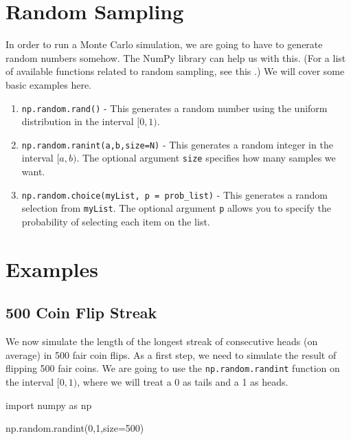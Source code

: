\documentclass{ximera}
\begin{document}
\section{Random Sampling}

In order to run a Monte Carlo simulation, we are going to have to generate random numbers somehow. The NumPy library can help us with this. (For a list of available functions related to random sampling, see this .) We will cover some basic examples here.
\begin{enumerate}
	\item \verb|np.random.rand()| - This generates a random number using the uniform distribution in the interval $[0,1)$.
	\item \verb|np.random.ranint(a,b,size=N)| - This generates a random integer in the interval $[a,b)$. The optional argument \verb|size| specifies how many samples we want.
	\item \verb|np.random.choice(myList, p = prob_list)| - This generates a random selection from \verb|myList|. The optional argument \verb|p| allows you to specify the probability of selecting each item on the list.
\end{enumerate}

\section{Examples}

\subsection{500 Coin Flip Streak}

We now simulate the length of the longest streak of consecutive heads (on average) in 500 fair coin flips. As a first step, we need to simulate the result of flipping 500 fair coins. We are going to use the \verb|np.random.randint| function on the interval $[0,1)$, where we will treat a 0 as tails and a 1 as heads.

\begin{sageCell}
import numpy as np

np.random.randint(0,1,size=500)
\end{sageCell}
\end{document}
